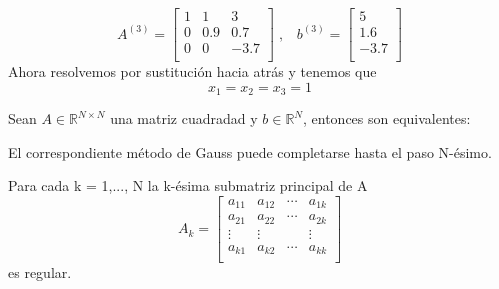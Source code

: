\begin{nlist}
\begin{ejemplo}
			\[ A^{(3)} =
			\begin{bmatrix}
			1 & 1 & 3 \\
			0 & 0.9 & 0.7 \\
			0 & 0 & -3.7 \\ 
			\end{bmatrix} \; ,
			\; \; \;
			b^{(3)} =
			\begin{bmatrix}
			5 \\
			1.6 \\
			-3.7 \\
			\end{bmatrix} \] %
			Ahora resolvemos por sustitución hacia atrás y tenemos que
			\[ x_1 = x_2 = x_3 = 1 \]
			\end{ejemplo}
			
			\begin{nprop}
			Sean $A \in \mathbb{R}^{N \times N}$ una matriz cuadradad y $b \in \mathbb{R}^N$, entonces son equivalentes:
				\begin{nlist}
				\item El correspondiente método de Gauss puede completarse hasta el paso N-ésimo.
				\item Para cada k = 1,..., N la k-ésima submatriz principal de A
				\[ A_k =
				\begin{bmatrix}
				a_{11} & a_{12} & \cdots & a_{1k} \\
				a_{21} & a_{22} & \cdots & a_{2k} \\
				\vdots & \vdots & & \vdots \\
				a_{k1} & a_{k2} & \cdots & a_{kk} \\
				\end{bmatrix} \]
				es regular.
				\end{nlist}
			\end{nprop}
			

\end{nlist}

